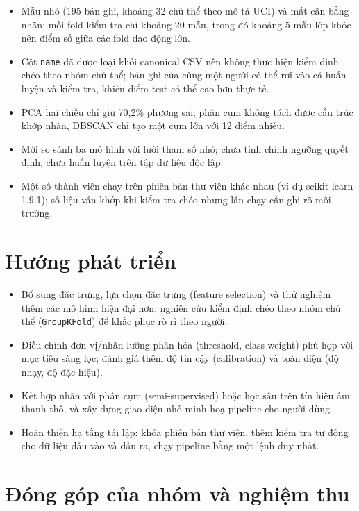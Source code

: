 \begin{itemize}
    \item Mẫu nhỏ (195 bản ghi, khoảng 32 chủ thể theo mô tả UCI) và mất cân bằng nhãn; mỗi
          fold kiểm tra chỉ khoảng 20 mẫu, trong đó khoảng 5 mẫu lớp khỏe nên điểm số giữa
          các fold dao động lớn.
    \item Cột \texttt{name} đã được loại khỏi canonical CSV nên không thực hiện kiểm định
          chéo theo nhóm chủ thể; bản ghi của cùng một người có thể rơi vào cả huấn luyện và
          kiểm tra, khiến điểm test có thể cao hơn thực tế.
    \item PCA hai chiều chỉ giữ 70,2\% phương sai; phân cụm không tách được cấu trúc khớp
          nhãn, DBSCAN chỉ tạo một cụm lớn với 12 điểm nhiễu.
    \item Mới so sánh ba mô hình với lưới tham số nhỏ; chưa tinh chỉnh ngưỡng quyết định,
          chưa huấn luyện trên tập dữ liệu độc lập.
    \item Một số thành viên chạy trên phiên bản thư viện khác nhau (ví dụ scikit-learn
          1.9.1); số liệu vẫn khớp khi kiểm tra chéo nhưng lần chạy cần ghi rõ môi trường.
\end{itemize}

\section{Hướng phát triển}

\begin{itemize}
    \item Bổ sung đặc trưng, lựa chọn đặc trưng (feature selection) và thử nghiệm thêm các
          mô hình hiện đại hơn; nghiên cứu kiểm định chéo theo nhóm chủ thể
          (\texttt{GroupKFold}) để khắc phục rò rỉ theo người.
    \item Điều chỉnh đơn vị/nhãn lưỡng phân hóa (threshold, class-weight) phù hợp với mục
          tiêu sàng lọc; đánh giá thêm độ tin cậy (calibration) và toàn diện (độ nhạy, độ
          đặc hiệu).
    \item Kết hợp nhãn với phân cụm (semi-supervised) hoặc học sâu trên tín hiệu âm thanh
          thô, và xây dựng giao diện nhỏ minh hoạ pipeline cho người dùng.
    \item Hoàn thiện hạ tầng tái lập: khóa phiên bản thư viện, thêm kiểm tra tự động cho
          dữ liệu đầu vào và đầu ra, chạy pipeline bằng một lệnh duy nhất.
\end{itemize}

\section{Đóng góp của nhóm và nghiệm thu}

